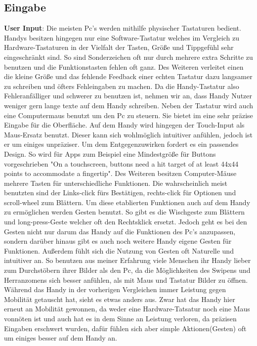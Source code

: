 \subsection{Eingabe}

\myNewSection
\textbf{User Input}: Die meisten Pc's werden mithilfe physischer Tastaturen bedient. Handys besitzen hingegen nur eine Software-Tastatur welches im Vergleich zu Hardware-Tastaturen in der Vielfalt der Tasten, Größe und Tippgefühl sehr eingeschränkt sind. So sind Sonderzeichen oft nur durch mehrere extra Schritte zu benutzen und die Funktionstasten fehlen oft ganz. Des Weiteren verleitet einen die kleine Größe und das fehlende Feedback einer echten Tastatur dazu langsamer zu schreiben und öfters Fehleingaben zu machen.\newline%
Da die Handy-Tastatur also Fehleranfälliger und schwerer zu benutzen ist, nehmen wir an, dass Handy Nutzer weniger gern lange texte auf dem Handy schreiben. \newline%
Neben der Tastatur wird auch eine Computermaus benutzt um den Pc zu steuern. Sie bietet im eine sehr präzise Eingabe für die Oberfläche. Auf dem Handy wird hingegen der Touch-Input als Maus-Ersatz benutzt. Dieser kann sich wohlmöglich intuitiver anfühlen, jedoch ist er um einiges unpräziser. Um dem Entgegenzuwirken fordert es ein passendes Design. So wird für Apps zum Beispiel eine Mindestgröße für Buttons vorgeschrieben "On a touchscreen, buttons need a hit target of at least 44x44 points to accommodate a fingertip"\cite{konventionen_buttonSize}. \newline%
Des Weiteren besitzen Computer-Mäuse mehrere Tasten für unterschiedliche Funktionen. Die wahrscheinlich meist benutzten sind der Links-click fürs Bestätigen, rechts-click für Optionen und scroll-wheel zum Blättern. Um diese etablierten Funktionen auch auf dem Handy zu ermöglichen werden Gesten benutzt. So gibt es die Wischgeste zum Blättern und long-press-Geste welcher oft den Rechtsklick ersetzt. \newline%
Jedoch geht es bei den Gesten nicht nur darum das Handy auf die Funktionen des Pc's anzupassen, sondern darüber hinaus gibt es auch noch weitere Handy eigene Gesten für Funktionen. Außerdem fühlt sich die Nutzung von Gesten oft Naturelle und intuitiver an. So benutzen aus meiner Erfahrung viele Menschen ihr Handy lieber zum Durchstöbern ihrer Bilder als den Pc, da die Möglichkeiten des Swipens und Herranzomens sich besser anfühlen, als mit Maus und Tastatur Bilder zu öffnen. \newline%
Während das Handy in der vorherigen Vergleichen immer Leistung gegen Mobilität getauscht hat, sieht es etwas anders aus. Zwar hat das Handy hier erneut an Mobilität gewonnen, da weder eine Hardware-Tatsatur noch eine Maus vonnöten ist und auch hat es in dem Sinne an Leistung verloren, da präzisen Eingaben erschwert wurden, dafür fühlen sich aber simple Aktionen(Gesten) oft um einiges besser auf dem Handy an. 

